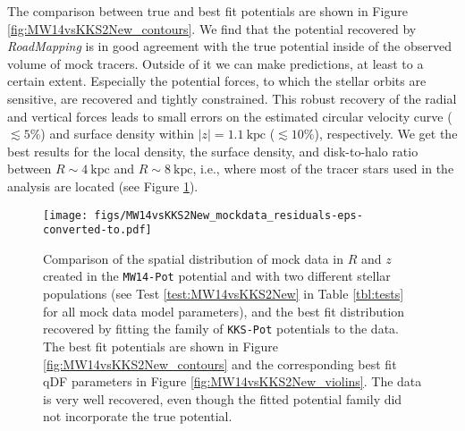 \documentclass[iop,revtex4,numberedappendix,appendixfloats]{emulateapj}
\newcommand{\RM}{{\sl RoadMapping}}
\begin{document}
The comparison between true and best fit potentials are shown in Figure \ref{fig:MW14vsKKS2New_contours}. We find that the potential recovered by \RM{} is in good agreement with the true potential inside of the observed volume of mock tracers. Outside of it we can make predictions, at least to a certain extent. Especially the potential forces, to which the stellar orbits are sensitive, are recovered and tightly constrained. This robust recovery of the radial and vertical forces leads to small errors on the estimated circular velocity curve ($\lesssim 5\%$) and surface density within $|z| = 1.1~\text{kpc}$ ($\lesssim 10\%$), respectively. We get the best results for the local density, the surface density, and disk-to-halo ratio between $R\sim4~\text{kpc}$ and $R\sim8~\text{kpc}$, i.e., where most of the tracer stars used in the analysis are located (see Figure \ref{fig:MW14vsKKS2New_mockdata_residuals}).

\begin{figure}[!htbp]
\centering
\texttt{[image: figs/MW14vsKKS2New\_mockdata\_residuals-eps-converted-to.pdf]}
\caption{Comparison of the spatial distribution of mock data in $R$ and $z$ created in the \texttt{MW14-Pot} potential and with two different stellar populations (see Test \ref{test:MW14vsKKS2New} in Table \ref{tbl:tests} for all mock data model parameters), and the best fit distribution recovered by fitting the family of \texttt{KKS-Pot} potentials to the data. The best fit potentials are shown in Figure \ref{fig:MW14vsKKS2New_contours} and the corresponding best fit qDF parameters in Figure \ref{fig:MW14vsKKS2New_violins}. The data is very well recovered, even though the fitted potential family did not incorporate the true potential.}
\label{fig:MW14vsKKS2New_mockdata_residuals}
\end{figure}
\end{document}
